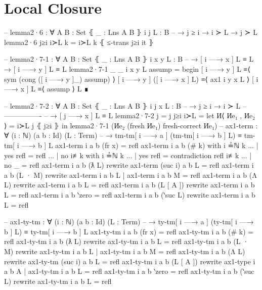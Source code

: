 \documentclass[logo,bsc,singlespacing,parskip,online]{infthesis}
\renewenvironment{code}{\mintedcopy[breaklines,breaksymbolleft=\;]{agda}}{\endmintedcopy}
\begin{document}
\section{Local Closure}
\label{appendix:f_local_closure}
\begin{code}
  -- lemma2·6 : ∀ {A B : Set} ⦃ _ : Lns A B ⦄ {i j} {L : B}
  --   → j ≥ i → i ≻ L → j ≻ L
  lemma2·6 j≥i i≻L k = i≻L k ⦃ ≤-trans j≥i it ⦄

  -- lemma2·7-1 : ∀ {A B : Set} ⦃ _ : Lns A B ⦄ {i x y} {L : B}
  --   → [ i —→ x ] L ≡ L → [ i —→ y ] L ≡ L
  lemma2·7-1 {_} {_} {i} {x} {y} {L} assump =
    begin
      [ i —→ y ] L
    ≡⟨ sym (cong ([ i —→ y ]_) assump) ⟩
      [ i —→ y ] ([ i —→ x ] L)
    ≡⟨ ax1 i y x L ⟩
      [ i —→ x ] L
    ≡⟨ assump ⟩
      L
    ∎

  -- lemma2·7-2 : ∀ {A B : Set} ⦃ _ : Lns A B ⦄ {i j x} {L : B}
  --   → j ≥ i    → i ≻ L
  --     ----------------
  --   → [ j —→ x ] L ≡ L
  lemma2·7-2 {j = j} j≥i i≻L =
    let И⟨ Иe₁ , Иe₂ ⟩ = i≻L j ⦃ j≥i ⦄ in
      lemma2·7-1 (Иe₂ (fresh Иe₁) {fresh-correct Иe₁})
\end{code}
\begin{code}
  -- ax1-term : ∀ (i : ℕ) (a b : Id) (L : Term)
  --   → tm-tm[ i —→ a ] (tm-tm[ i —→ b ] L) ≡ tm-tm[ i —→ b ] L
  ax1-term i a b (fr x) = refl
  ax1-term i a b (# k) with i ≟ℕ k
  ... | yes refl = refl
  ... | no  i≢k  with i ≟ℕ k
  ... |   yes refl = contradiction refl i≢k
  ... |   no  _    = refl
  ax1-term i a b (ƛ L) rewrite ax1-term (suc i) a b L = refl
  ax1-term i a b (L · M)
    rewrite ax1-term i a b L | ax1-term i a b M = refl
  ax1-term i a b (Λ L) rewrite ax1-term i a b L = refl
  ax1-term i a b (L [ A ]) rewrite ax1-term i a b L = refl
  ax1-term i a b ‵zero = refl
  ax1-term i a b (‵suc L) rewrite ax1-term i a b L = refl

  -- ax1-ty-tm : ∀ (i : ℕ) (a b : Id) (L : Term)
  --   → ty-tm[ i —→ a ] (ty-tm[ i —→ b ] L) ≡ ty-tm[ i —→ b ] L
  ax1-ty-tm i a b (fr x) = refl
  ax1-ty-tm i a b (# k) = refl
  ax1-ty-tm i a b (ƛ L) rewrite
    ax1-ty-tm i a b L = refl
  ax1-ty-tm i a b (L · M) rewrite
    ax1-ty-tm i a b L | ax1-ty-tm i a b M = refl
  ax1-ty-tm i a b (Λ L)
    rewrite ax1-ty-tm (suc i) a b L = refl
  ax1-ty-tm i a b (L [ A ])
    rewrite ax1-type i a b A | ax1-ty-tm i a b L = refl
  ax1-ty-tm i a b ‵zero = refl
  ax1-ty-tm i a b (‵suc L)
    rewrite ax1-ty-tm i a b L = refl
\end{code}
\end{document}

